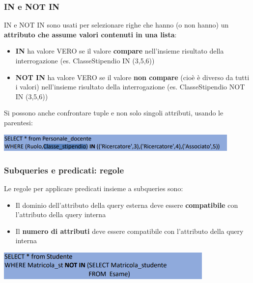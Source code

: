 \documentclass[12pt]{article}
\begin{document}
\subsubsection{IN e NOT IN}
IN e NOT IN sono usati per selezionare righe che hanno (o non hanno) un \textbf{attributo che assume valori contenuti in una lista}:
\begin{itemize}
    \item \textbf{IN} ha valore VERO se il valore \textbf{compare} nell'insieme risultato della interrogazione (es. ClasseStipendio IN (3,5,6))
    \item \textbf{NOT IN} ha valore VERO se il valore \textbf{non compare} (cioè è diverso da tutti i valori) nell'insieme risultato della interrogazione (es. ClasseStipendio NOT IN (3,5,6))
\end{itemize}
Si possono anche confrontare tuple e non solo singoli attributi, usando le parentesi:
\begin{center}
    \includegraphics[width = 0.90\textwidth]{Images/222.PNG}
\end{center}
\subsubsection{Subqueries e predicati: regole}
Le regole per applicare predicati insieme a subqueries sono:
\begin{itemize}
    \item Il dominio dell'attributo della query esterna deve essere \textbf{compatibile} con l'attributo della query interna
    \item Il \textbf{numero di attributi} deve essere compatibile con l'attributo della query interna
\end{itemize}
\begin{center}
    \includegraphics[width = 0.80\textwidth]{Images/223.PNG}
\end{center}
\end{document}
